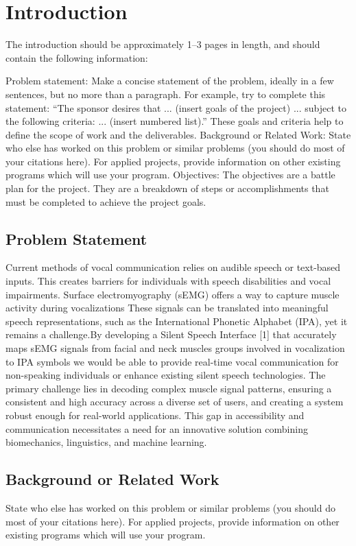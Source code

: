 \chapter{Introduction}
The introduction should be approximately 1–3 pages in length, and should contain the following information:

Problem statement: Make a concise statement of the problem, ideally in a few sentences, but no more than a paragraph. For example, try to complete this statement: “The sponsor desires that ... (insert goals of the project) ... subject to the following criteria: ... (insert numbered list).” These goals and criteria help to define the scope of work and the deliverables.
Background or Related Work: State who else has worked on this problem or similar problems (you should do most of your citations here). For applied projects, provide information on other existing programs which will use your program.
Objectives: The objectives are a battle plan for the project. They are a breakdown of steps or accomplishments that must be completed to achieve the project goals.

\section{Problem Statement}
Current methods of vocal communication relies on audible speech or text-based inputs. This creates barriers for individuals with speech disabilities and vocal impairments. 
Surface electromyography (sEMG) offers a way to capture muscle activity during vocalizations
 These signals can be translated into meaningful speech representations, such as the International Phonetic Alphabet (IPA), yet it remains a challenge.By developing a Silent Speech Interface [1] that accurately maps sEMG signals from facial and neck muscles groups involved in vocalization to IPA symbols we would be able to provide real-time vocal communication for non-speaking individuals or enhance existing silent speech technologies. The primary challenge lies in decoding complex muscle signal patterns, ensuring a consistent and high accuracy across a diverse set of users, and creating a system robust enough for real-world applications. This gap in accessibility and communication necessitates a need for an innovative solution combining biomechanics, linguistics, and machine learning.


\section{Background or Related Work}
State who else has worked on this problem or similar problems (you should do most of your citations here). For applied projects, provide information on other existing programs which will use your program.

